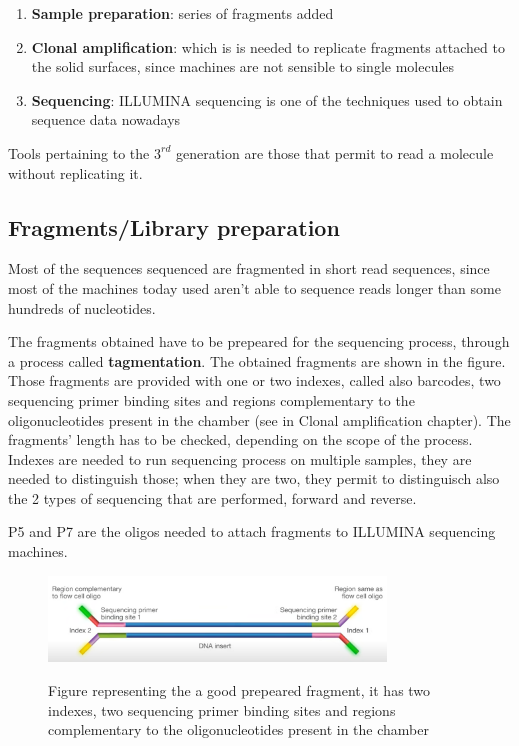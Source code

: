\begin{enumerate}
	\item \textbf{Sample preparation}: series of fragments added 
	\item \textbf{Clonal amplification}: which is is needed to replicate fragments attached to the solid surfaces, since machines are not sensible to single molecules
	\item \textbf{Sequencing}: ILLUMINA sequencing is one of the techniques used to obtain sequence data nowadays
\end{enumerate}

Tools pertaining to the $3^{rd}$ generation are those that permit to read a molecule without replicating it.

\subsection{Fragments/Library preparation}
Most of the sequences sequenced are fragmented in short read sequences, since most of the machines today used aren't able to sequence reads longer than some hundreds of nucleotides.


The fragments obtained have to be prepeared for the sequencing process, through a process called \textbf{tagmentation}. The obtained fragments are shown in the figure. Those fragments are provided with one or two indexes, called also barcodes, two sequencing primer binding sites and regions complementary to the oligonucleotides present in the chamber (see in Clonal amplification chapter). The fragments' length has to be checked, depending on the scope of the process. Indexes are needed to run sequencing process on multiple samples, they are needed to distinguish those; when they are two, they permit to distinguisch also the 2 types of sequencing that are performed, forward and reverse.

P5 and P7 are the oligos needed to attach fragments to ILLUMINA sequencing machines. 

\begin{figure}[h]
\caption{Figure representing the a good prepeared fragment, it has two indexes, two sequencing primer binding sites and regions complementary to the oligonucleotides present in the chamber}
\centering
\includegraphics[width=0.8\textwidth]{tagmentedFragments}
\label{}
\end{figure}

